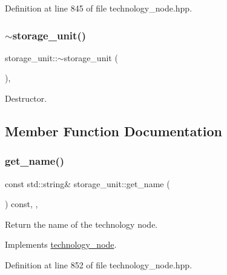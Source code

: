 Definition at line 845 of file technology\+\_\+node.\+hpp.

\mbox{\label{structstorage__unit_adb4df67a33ed30ae808fdcf74176d2e1}} 
\subsubsection{\texorpdfstring{$\sim$storage\+\_\+unit()}{~storage\_unit()}}
{\footnotesize\ttfamily storage\+\_\+unit\+::$\sim$storage\+\_\+unit (\begin{DoxyParamCaption}{ }\end{DoxyParamCaption})\hspace{0.3cm}{\ttfamily [override]}, {\ttfamily [default]}}



Destructor. 



\subsection{Member Function Documentation}
\mbox{\label{structstorage__unit_a264a6ad9a5d692f1f779e4c803df33d7}} 
\subsubsection{\texorpdfstring{get\+\_\+name()}{get\_name()}}
{\footnotesize\ttfamily const std\+::string\& storage\+\_\+unit\+::get\+\_\+name (\begin{DoxyParamCaption}{ }\end{DoxyParamCaption}) const\hspace{0.3cm}{\ttfamily [inline]}, {\ttfamily [override]}, {\ttfamily [virtual]}}



Return the name of the technology node. 



Implements \hyperlink{structtechnology__node_ade1d568637cfe8de91fc732fba4d62d5}{technology\+\_\+node}.



Definition at line 852 of file technology\+\_\+node.\+hpp.


